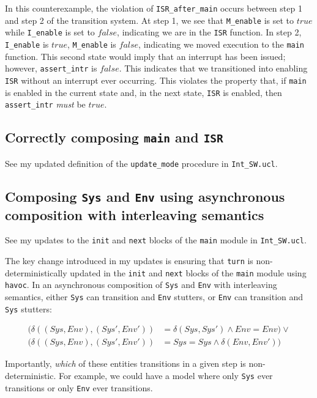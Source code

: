 \documentclass{article}
\newcommand{\code}[1]{\texttt{#1}}
\begin{document}
In this counterexample, the violation of \code{ISR\_after\_main} occurs between step 1 and step 2 of the transition system. At step 1, we see that \code{M\_enable} is set to $true$ while \code{I\_enable} is set to $false$, indicating we are in the \code{ISR} function. In step 2, \code{I\_enable} is $true$, \code{M\_enable} is $false$, indicating we moved execution to the \code{main} function. This second state would imply that an interrupt has been issued; however, \code{assert\_intr} is $false$. This indicates that we transitioned into enabling \code{ISR} without an interrupt ever occurring. This violates the property that, if \code{main} is enabled in the current state and, in the next state, \code{ISR} is enabled, then \code{assert\_intr} \emph{must} be $true$.

\subsection{Correctly composing \code{main} and \code{ISR}}

See my updated definition of the \code{update\_mode} procedure in \code{Int\_SW.ucl}.

\subsection{Composing \code{Sys} and \code{Env} using asynchronous composition with interleaving semantics}

See my updates to the \code{init} and \code{next} blocks of the \code{main} module in \code{Int\_SW.ucl}.

The key change introduced in my updates is ensuring that \code{turn} is non-deterministically updated in the \code{init} and \code{next} blocks of the \code{main} module using \code{havoc}. In an asynchronous composition of \code{Sys} and \code{Env} with interleaving semantics, either \code{Sys} can transition and \code{Env} stutters, or \code{Env} can transition and \code{Sys} stutters:

\begin{align*}
(\delta((Sys, Env), (Sys', Env')) &= \delta(Sys, Sys') \land Env = Env) \lor \\
(\delta((Sys, Env), (Sys', Env')) &= Sys = Sys \land \delta(Env, Env'))
\end{align*}

Importantly, \emph{which} of these entities transitions in a given step is non-deterministic. For example, we could have a model where only \code{Sys} ever transitions or only \code{Env} ever transitions.
\end{document}
